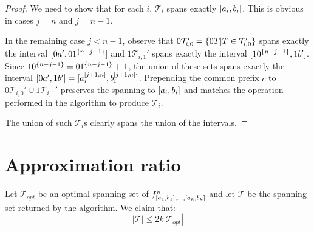 \begin{proof}
We need to show that for each $i$,
$\mathcal{T}_i$ spans exactly $[a_i, b_i]$.
This is obvious in cases $j = n$ and $j = n-1$.

In the remaining case $j < n-1$,
observe that
$0 \mathcal{T}_{i, 0}'
= \{0 T | T \in \mathcal{T}_{i, 0}'\}$
spans exactly the interval
$[0 a', 0 1^{\{n-j-1\}}]$
and $1 \mathcal{T}_{i, 1}'$
spans exactly the interval
$[1 0^{\{n-j-1\}}, 1 b']$.
Since $1 0^{\{n-j-1\}} = 0 1^{\{n-j-1\}} + 1$,
the union of these sets
spans exactly the interval
$[0 a', 1 b']
= [a_i^{[j+1, n]}, b_i^{[j+1, n]}]$.
Prepending the common prefix $c$ to
$0 \mathcal{T}_{i, 0}' \cup 1 \mathcal{T}_{i, 1}'$
preserves the spanning to
$[a_i, b_i]$
and matches the operation performed in the algorithm
to produce $\mathcal{T}_i$.

The union of such $\mathcal{T}_i$s clearly spans
the union of the intervals.
\end{proof}

\section{Approximation ratio}

\begin{theorem}
\label{theorem:2kapproxratio}
Let $\mathcal{T}_{opt}$ be an optimal spanning set of
$f^n_{[a_1, b_1], \ldots, [a_k, b_k]}$
and let $\mathcal{T}$ be the spanning set returned
by the algorithm.
We claim that:
\begin{equation*}
|\mathcal{T}| \leq 2k |\mathcal{T}_{opt}|
\end{equation*}
\end{theorem}

